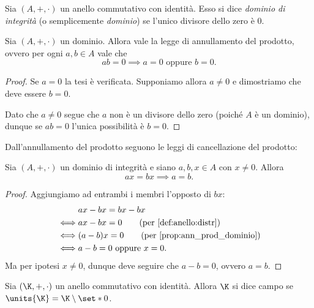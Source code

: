 \begin{definition}
    \label{def:dominio}
    Sia $(A, +, \cdot)$ un anello commutativo con identità. Esso si dice \emph{dominio di integrità} (o semplicemente \emph{dominio}) se l'unico divisore dello zero è $0$.
\end{definition}

\begin{proposition}
    \label{prop:ann_prod_dominio}
    Sia $(A, +, \cdot)$ un dominio. Allora vale la legge di annullamento del prodotto, ovvero per ogni $a, b \in A$ vale che \[
        ab = 0 \implies a = 0 \text{ oppure } b = 0.    
    \]
\end{proposition}
\begin{proof}
    Se $a = 0$ la tesi è verificata. Supponiamo allora $a \neq 0$ e dimostriamo che deve essere $b = 0$.

    Dato che $a \neq 0$ segue che $a$ non è un divisore dello zero (poiché $A$ è un dominio), dunque se $ab = 0$ l'unica possibilità è $b = 0$.
\end{proof}

Dall'annullamento del prodotto seguono le leggi di cancellazione del prodotto:
\begin{corollary}
    \label{cor:canc_prod_dominio}
    Sia $(A, +, \cdot)$ un dominio di integrità e siano $a, b, x \in A$ con $x \neq 0$. Allora \[
        ax = bx \implies a = b.    
    \]
\end{corollary}
\begin{proof}
    Aggiungiamo ad entrambi i membri l'opposto di $bx$: \begin{align*}
        &ax - bx = bx - bx\\
        \iff &ax - bx = 0 \tag{per \ref{def:anello:distr}}\\
        \iff &(a - b)x = 0 \tag{per \ref{prop:ann_prod_dominio}}\\
        \iff &a-b = 0 \text{ oppure } x = 0.
    \end{align*} Ma per ipotesi $x \neq 0$, dunque deve seguire che $a - b = 0$, ovvero $a = b$.
\end{proof}

\begin{definition}
    [Campo]
    Sia $(\K, +, \cdot)$ un anello commutativo con identità. Allora $\K$ si dice campo se $\units{\K} = \K \setminus \set*{0}$.
\end{definition}

